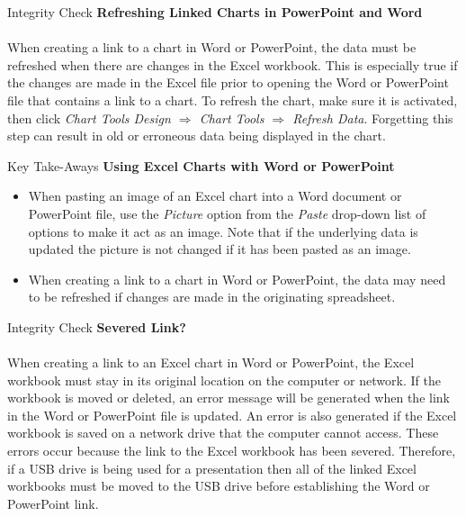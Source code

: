 \begin{center}
	\begin{infobox}{Integrity Check}
		\textbf{Refreshing Linked Charts in PowerPoint and Word}
		\\
		\\
		When creating a link to a chart in Word or PowerPoint, the data must be refreshed when there are changes in the Excel workbook. This is especially true if the changes are made in the Excel file prior to opening the Word or PowerPoint file that contains a link to a chart. To refresh the chart, make sure it is activated, then click \textit{Chart Tools Design $ \Rightarrow $ Chart Tools $ \Rightarrow $ Refresh Data}. Forgetting this step can result in old or erroneous data being displayed in the chart.
	\end{infobox}
\end{center}

\begin{center}
	\begin{tkwbox}{Key Take-Aways}
		\textbf{Using Excel Charts with Word or PowerPoint}
		\\
		\begin{itemize}
			\setlength{\itemsep}{0pt}
			\setlength{\parskip}{0pt}
			\setlength{\parsep}{0pt}

			\item When pasting an image of an Excel chart into a Word document or PowerPoint file, use the \textit{Picture} option from the \textit{Paste} drop-down list of options to make it act as an image. Note that if the underlying data is updated the picture is not changed if it has been pasted as an image.
			\item When creating a link to a chart in Word or PowerPoint, the data may need to be refreshed if changes are made in the originating spreadsheet. 
					
		\end{itemize}
	\end{tkwbox}
\end{center}

\begin{center}
	\begin{infobox}{Integrity Check}
		\textbf{Severed Link?}
		\\
		\\
		When creating a link to an Excel chart in Word or PowerPoint, the Excel workbook must stay in its original location on the computer or network. If the workbook is moved or deleted, an error message will be generated when the link in the Word or PowerPoint file is updated. An error is also generated if the Excel workbook is saved on a network drive that the computer cannot access. These errors occur because the link to the Excel workbook has been severed. Therefore, if a USB drive is being used for a presentation then all of the linked Excel workbooks must be moved to the USB drive before establishing the Word or PowerPoint link.
	\end{infobox}
\end{center}

